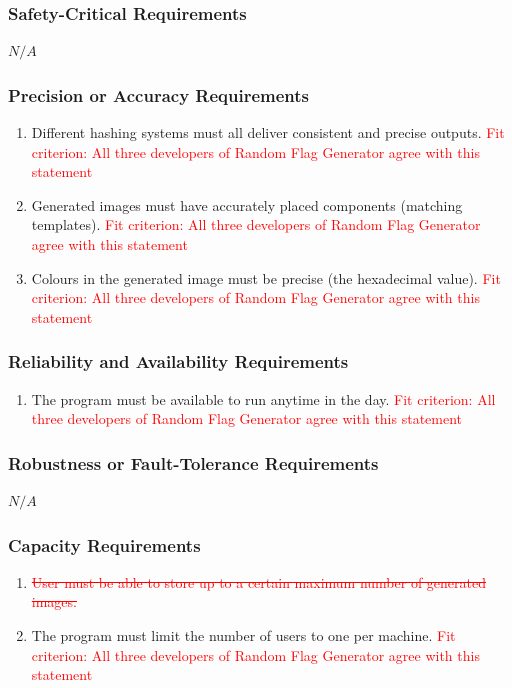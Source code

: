 \documentclass[12pt, titlepage]{article}
\begin{document}
\subsubsection{Safety-Critical Requirements}
$N/A$
\subsubsection{Precision or Accuracy Requirements}
\begin{enumerate}[label=PE\arabic*., resume=pes]
    \item Different hashing systems must all deliver consistent and precise outputs. \textcolor{red}{Fit criterion: All three developers of Random Flag Generator agree with this statement}
    \item Generated images must have accurately placed components (matching templates). \textcolor{red}{Fit criterion: All three developers of Random Flag Generator agree with this statement}
    \item Colours in the generated image must be precise (the hexadecimal value). \textcolor{red}{Fit criterion: All three developers of Random Flag Generator agree with this statement}
\end{enumerate}

\subsubsection{Reliability and Availability Requirements}
\begin{enumerate}[label=PE\arabic*., resume=pes]
    \item The program must be available to run anytime in the day. \textcolor{red}{Fit criterion: All three developers of Random Flag Generator agree with this statement}
\end{enumerate}  

\subsubsection{Robustness or Fault-Tolerance Requirements}
$N/A$
\subsubsection{Capacity Requirements}
\begin{enumerate}[label=PE\arabic*., resume=pes]
    \item \textcolor{red}{\sout{User must be able to store up to a certain maximum number of generated images.}}
    \item The program must limit the number of users to one per machine. \textcolor{red}{Fit criterion: All three developers of Random Flag Generator agree with this statement}
\end{enumerate} 
\end{document}
